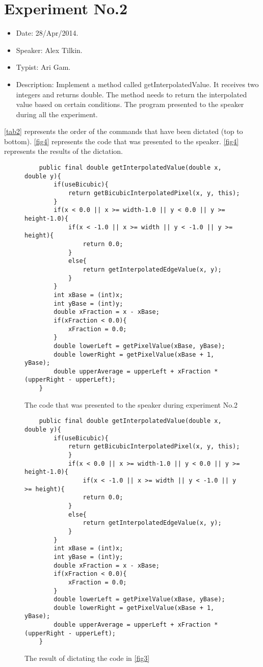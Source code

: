 \section{Experiment No.2}
\begin{itemize}
	\item Date: 28/Apr/2014.
	\item Speaker: Alex Tilkin.
	\item Typist: Ari Gam.
	\item Description: Implement a method called getInterpolatedValue. It receives two integers and returns double. The method needs to return the interpolated value based on certain conditions. The program presented to the speaker during all the experiment.
\end{itemize}
\autoref{tab2} represents the order of the commands that have been dictated (top to bottom). \autoref{fig4} represents the code that was presented to the speaker. \autoref{fig4} represents the results of the dictation.
\begin{figure}[H]
	\begin{lstlisting}
	public final double getInterpolatedValue(double x, double y){
		if(useBicubic){
			return getBicubicInterpolatedPixel(x, y, this);
		}
		if(x < 0.0 || x >= width-1.0 || y < 0.0 || y >= height-1.0){
			if(x < -1.0 || x >= width || y < -1.0 || y >= height){
				return 0.0;
			}
			else{
				return getInterpolatedEdgeValue(x, y);
			}
		}
		int xBase = (int)x;
		int yBase = (int)y;
		double xFraction = x - xBase;
		if(xFraction < 0.0){
			xFraction = 0.0;
		}
		double lowerLeft = getPixelValue(xBase, yBase);
		double lowerRight = getPixelValue(xBase + 1, yBase);
		double upperAverage = upperLeft + xFraction * (upperRight - upperLeft);
	}
	\end{lstlisting}
	\caption{The code that was presented to the speaker during experiment No.2}
	\label{fig4}
\end{figure}
\begin{figure}[H]
	\begin{lstlisting}
	public final double getInterpolatedValue(double x, double y){
		if(useBicubic){
			return getBicubicInterpolatedPixel(x, y, this);
			}
			if(x < 0.0 || x >= width-1.0 || y < 0.0 || y >= height-1.0){
				if(x < -1.0 || x >= width || y < -1.0 || y >= height){
				return 0.0;
			}
			else{
				return getInterpolatedEdgeValue(x, y);
			}
		}
		int xBase = (int)x;
		int yBase = (int)y;
		double xFraction = x - xBase;
		if(xFraction < 0.0){
			xFraction = 0.0;
		}
		double lowerLeft = getPixelValue(xBase, yBase);
		double lowerRight = getPixelValue(xBase + 1, yBase);
		double upperAverage = upperLeft + xFraction * (upperRight - upperLeft);
	}
	\end{lstlisting}
	\caption{The result of dictating the code in \autoref{fig3}}
	\label{fig4}
\end{figure}
